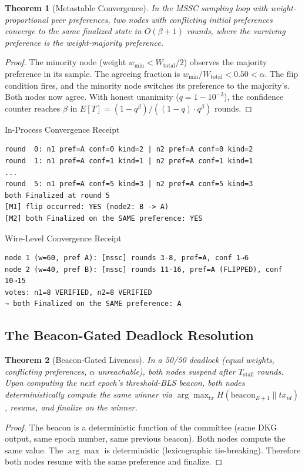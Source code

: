 \documentclass[11pt, a4paper]{article}
\theoremstyle{plain}
\newtheorem{theorem}{Theorem}
\theoremstyle{definition}
\theoremstyle{remark}
\begin{document}
\begin{theorem}[Metastable Convergence]
\label{thm:convergence}
In the MSSC sampling loop with weight-proportional peer preferences,
two nodes with conflicting initial preferences converge to the same
finalized state in $O(\beta + 1)$ rounds, where the surviving
preference is the weight-majority preference.
\end{theorem}
\begin{proof}
The minority node (weight $w_{\min} < W_{\text{total}}/2$) observes
the majority preference in its sample. The agreeing fraction is
 $w_{\min} / W_{\text{total}} < 0.50 < \alpha$. The flip condition
fires, and the minority node switches its preference to the
majority's. Both nodes now agree. With honest unanimity
($q = 1 - 10^{-3}$), the confidence counter reaches $\beta$ in
 $E[T] = (1 - q^\beta)/((1-q) \cdot q^\beta)$ rounds.
\end{proof}

\begin{receiptbox}{In-Process Convergence Receipt}
\begin{verbatim}
round  0: n1 pref=A conf=0 kind=2 | n2 pref=A conf=0 kind=2
round  1: n1 pref=A conf=1 kind=1 | n2 pref=A conf=1 kind=1
...
round  5: n1 pref=A conf=5 kind=3 | n2 pref=A conf=5 kind=3
both Finalized at round 5
[M1] flip occurred: YES (node2: B -> A)
[M2] both Finalized on the SAME preference: YES
\end{verbatim}
\end{receiptbox}

\begin{receiptbox}{Wire-Level Convergence Receipt}
\begin{verbatim}
node 1 (w=60, pref A): [mssc] rounds 3-8, pref=A, conf 1→6
node 2 (w=40, pref B): [mssc] rounds 11-16, pref=A (FLIPPED), conf 10→15
votes: n1=8 VERIFIED, n2=8 VERIFIED
→ both Finalized on the SAME preference: A
\end{verbatim}
\end{receiptbox}

\subsection{The Beacon-Gated Deadlock Resolution}

\begin{theorem}[Beacon-Gated Liveness]
\label{thm:beacon}
In a 50/50 deadlock (equal weights, conflicting preferences, $\alpha$ unreachable), both nodes suspend after $T_{\text{stall}}$ rounds. Upon
computing the next epoch's threshold-BLS beacon, both nodes
deterministically compute the same winner via
 $\arg\max_{tx} H(\text{beacon}_{E+1} \| tx_{id})$, resume, and
finalize on the winner.
\end{theorem}
\begin{proof}
The beacon is a deterministic function of the committee (same DKG
output, same epoch number, same previous beacon). Both nodes compute
the same value. The $\arg\max$ is deterministic (lexicographic
tie-breaking). Therefore both nodes resume with the same preference
and finalize.
\end{proof}
\end{document}
